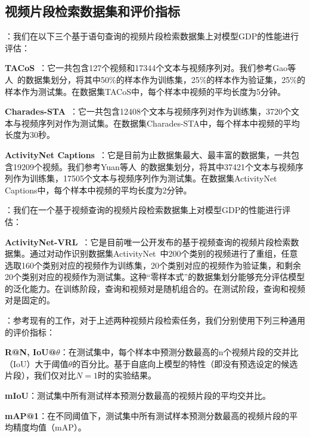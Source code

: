 \subsection{视频片段检索数据集和评价指标}

\textbf{}：我们在以下三个基于语句查询的视频片段检索数据集上对模型GDP的性能进行评估：

\textbf{TACoS}~\cite{regneri2013grounding}：它一共包含127个视频和17344个文本与视频序列对。我们参考Gao等人~\cite{gao2017tall}的数据集划分，将其中50\%的样本作为训练集，25\%的样本作为验证集，25\%的样本作为测试集。在数据集TACoS中，每个样本中视频的平均长度为5分钟。

\textbf{Charades-STA}~\cite{gao2017tall}：它一共包含12408个文本与视频序列对作为训练集，3720个文本与视频序列对作为测试集。在数据集Charades-STA中，每个样本中视频的平均长度为30秒。

\textbf{ActivityNet Captions}~\cite{krishna2017dense}：它是目前为止数据集最大、最丰富的数据集，一共包含19209个视频。我们参考Yuan等人~\cite{yuan2019find}的数据集划分，将其中37421个文本与视频序列作为训练集，17505个文本与视频序列作为测试集。在数据集ActivityNet Captions中，每个样本中视频的平均长度为2分钟。


\textbf{}：我们在一个基于视频查询的视频片段检索数据集上对模型GDP的性能进行评估：

\textbf{ActivityNet-VRL}~\cite{feng2018video}：它是目前唯一公开发布的基于视频查询的视频片段检索数据集。通过对动作识别数据集ActivityNet~\cite{caba2015activitynet}中200个类别的视频进行了重组，任意选取160个类别对应的视频作为训练集，20个类别对应的视频作为验证集，和剩余20个类别对应的视频作为测试集。这种“零样本式”的数据集划分能够充分评估模型的泛化能力。在训练阶段，查询和视频对是随机组合的。在测试阶段，查询和视频对是固定的。


\textbf{}：参考现有的工作，对于上述两种视频片段检索任务，我们分别使用下列三种通用的评价指标：

\textbf{R@N, IoU@$\theta$}：在测试集中，每个样本中预测分数最高的n个视频片段的交并比（IoU）大于阈值$\theta$的百分比。基于自底向上模型的特性（即没有预选设定的候选片段），我们仅对比$N=1$时的实验结果。

\textbf{mIoU}：测试集中所有测试样本预测分数最高的视频片段的平均交并比。

\textbf{mAP@1}：在不同阈值下，测试集中所有测试样本预测分数最高的视频片段的平均精度均值（mAP）。


